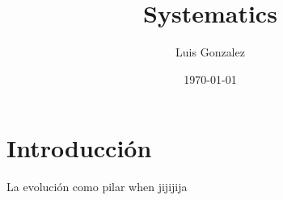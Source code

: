 \documentclass[12pt]{article}
\title{Systematics}
\author{Luis Gonzalez}
\date{\today}
\begin{document}
\maketitle

\section{Introducción}

La evolución como pilar
when jijijija
\end{document}
